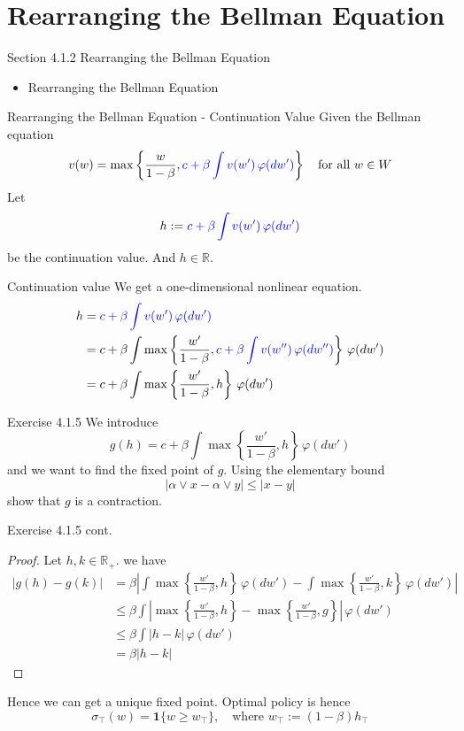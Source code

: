 \section{Rearranging the Bellman Equation}
\begin{frame}{Section 4.1.2 Rearranging the Bellman Equation}
    \begin{itemize}
        \item Rearranging the Bellman Equation
    \end{itemize}
\end{frame}
\begin{frame}{Rearranging the Bellman Equation - Continuation Value}
    Given the Bellman equation
    $$
    v(w)  = \max\left\{\frac{w}{1-\beta}, \textcolor{blue}{c+\beta\int v(w') \,\varphi(dw')}\right\}\quad\text{for all $w\in W$}
    $$
    Let 
    $$
    h:=\textcolor{blue}{c+\beta\int v(w') \,\varphi(dw')}
    $$
    be the continuation value. And $h\in \mathbb{R}$.
\end{frame}

\begin{frame}{Continuation value}
We get a one-dimensional nonlinear equation. 
    \begin{align*}
        h &=\textcolor{blue}{c+\beta\int v(w') \,\varphi(dw')}\\
        &= c + \beta \int \max\left\{\frac{w'}{1-\beta}, \textcolor{blue}{c+\beta\int v(w'') \,\varphi(dw'')}\right\}\, \varphi(dw')\\
        &= c+\beta\int \max\left\{\frac{w'}{1-\beta}, h\right\}\, \varphi(dw')
    \end{align*}
\end{frame}

\begin{frame}{Exercise 4.1.5}
    We introduce
    $$
    g(h) = c+\beta\int \max\left\{\frac{w'}{1-\beta}, h\right\}\, \varphi(dw')
    $$
    and we want to find the fixed point of $g$. Using the elementary bound
    $$
    |\alpha\vee x- \alpha \vee y|\le |x-y|
    $$
    show that $g$ is a contraction.
\end{frame}
\begin{frame}{Exercise 4.1.5 cont.}
\begin{proof}
    Let $h,k\in\mathbb{R}_+$. we have
    \begin{align*}
        |g(h)-g(k)| &= \beta\left|\int \max\left\{\frac{w'}{1-\beta},h\right\}\,\varphi(dw')-\int \max\left\{\frac{w'}{1-\beta},k\right\}\,\varphi(dw')\right|\\
        &\le \beta \int\left|\max\left\{\frac{w'}{1-\beta},h\right\}-\max\left\{\frac{w'}{1-\beta},g\right\}\right|\,\varphi(dw')\tag{Jensen}\\
        &\le \beta \int |h-k|\,\varphi(dw')\tag{Given}\\
        &= \beta|h-k|
    \end{align*}
\end{proof}
 Hence we can get a unique fixed point. Optimal policy is hence
    $$
    \sigma_\top (w) = \mathbf{1}\{w\ge w_\top\},\quad \text{where $w_\top:= (1-\beta)h_\top$}
    $$
\end{frame}

